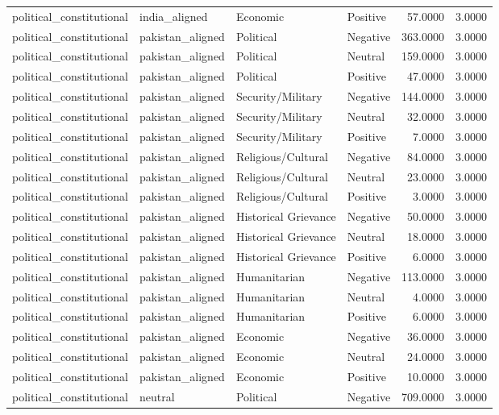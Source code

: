 \begin{longtable}{llllrr}
political\_constitutional & india\_aligned & Economic & Positive & 57.0000 & 3.0000 \\
political\_constitutional & pakistan\_aligned & Political & Negative & 363.0000 & 3.0000 \\
political\_constitutional & pakistan\_aligned & Political & Neutral & 159.0000 & 3.0000 \\
political\_constitutional & pakistan\_aligned & Political & Positive & 47.0000 & 3.0000 \\
political\_constitutional & pakistan\_aligned & Security/Military & Negative & 144.0000 & 3.0000 \\
political\_constitutional & pakistan\_aligned & Security/Military & Neutral & 32.0000 & 3.0000 \\
political\_constitutional & pakistan\_aligned & Security/Military & Positive & 7.0000 & 3.0000 \\
political\_constitutional & pakistan\_aligned & Religious/Cultural & Negative & 84.0000 & 3.0000 \\
political\_constitutional & pakistan\_aligned & Religious/Cultural & Neutral & 23.0000 & 3.0000 \\
political\_constitutional & pakistan\_aligned & Religious/Cultural & Positive & 3.0000 & 3.0000 \\
political\_constitutional & pakistan\_aligned & Historical Grievance & Negative & 50.0000 & 3.0000 \\
political\_constitutional & pakistan\_aligned & Historical Grievance & Neutral & 18.0000 & 3.0000 \\
political\_constitutional & pakistan\_aligned & Historical Grievance & Positive & 6.0000 & 3.0000 \\
political\_constitutional & pakistan\_aligned & Humanitarian & Negative & 113.0000 & 3.0000 \\
political\_constitutional & pakistan\_aligned & Humanitarian & Neutral & 4.0000 & 3.0000 \\
political\_constitutional & pakistan\_aligned & Humanitarian & Positive & 6.0000 & 3.0000 \\
political\_constitutional & pakistan\_aligned & Economic & Negative & 36.0000 & 3.0000 \\
political\_constitutional & pakistan\_aligned & Economic & Neutral & 24.0000 & 3.0000 \\
political\_constitutional & pakistan\_aligned & Economic & Positive & 10.0000 & 3.0000 \\
political\_constitutional & neutral & Political & Negative & 709.0000 & 3.0000 \\

\end{longtable}
